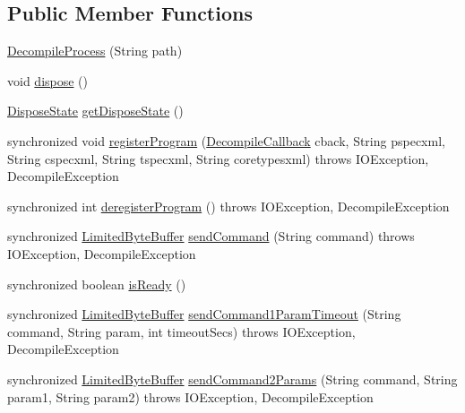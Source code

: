 \subsection*{Public Member Functions}
\begin{DoxyCompactItemize}
\item 
\mbox{\hyperlink{classghidra_1_1app_1_1decompiler_1_1_decompile_process_a1d87e3793a82ac3421528f78ce195b17}{Decompile\+Process}} (String path)
\item 
void \mbox{\hyperlink{classghidra_1_1app_1_1decompiler_1_1_decompile_process_aa2643106f26e9f4e6e603431903f29e4}{dispose}} ()
\item 
\mbox{\hyperlink{enumghidra_1_1app_1_1decompiler_1_1_decompile_process_1_1_dispose_state}{Dispose\+State}} \mbox{\hyperlink{classghidra_1_1app_1_1decompiler_1_1_decompile_process_ac9ea5dc37b98e60a02ebc537bde184bb}{get\+Dispose\+State}} ()
\item 
synchronized void \mbox{\hyperlink{classghidra_1_1app_1_1decompiler_1_1_decompile_process_a40583f5d5b24e837f7837ccab1510330}{register\+Program}} (\mbox{\hyperlink{classghidra_1_1app_1_1decompiler_1_1_decompile_callback}{Decompile\+Callback}} cback, String pspecxml, String cspecxml, String tspecxml, String coretypesxml)  throws I\+O\+Exception, 			\+Decompile\+Exception 
\item 
synchronized int \mbox{\hyperlink{classghidra_1_1app_1_1decompiler_1_1_decompile_process_a0f33c60970b4db8f9f42d31623cd91c9}{deregister\+Program}} ()  throws I\+O\+Exception, Decompile\+Exception 
\item 
synchronized \mbox{\hyperlink{classghidra_1_1app_1_1decompiler_1_1_limited_byte_buffer}{Limited\+Byte\+Buffer}} \mbox{\hyperlink{classghidra_1_1app_1_1decompiler_1_1_decompile_process_a36fc409f22c26d36509fc3c06a8b9f93}{send\+Command}} (String command)  throws I\+O\+Exception, Decompile\+Exception 
\item 
synchronized boolean \mbox{\hyperlink{classghidra_1_1app_1_1decompiler_1_1_decompile_process_a7ceab405dca0a6c7e79998fd632c2c0b}{is\+Ready}} ()
\item 
synchronized \mbox{\hyperlink{classghidra_1_1app_1_1decompiler_1_1_limited_byte_buffer}{Limited\+Byte\+Buffer}} \mbox{\hyperlink{classghidra_1_1app_1_1decompiler_1_1_decompile_process_a4091afccee2689876c3426cb8c6b663c}{send\+Command1\+Param\+Timeout}} (String command, String param, int timeout\+Secs)  throws I\+O\+Exception, Decompile\+Exception 
\item 
synchronized \mbox{\hyperlink{classghidra_1_1app_1_1decompiler_1_1_limited_byte_buffer}{Limited\+Byte\+Buffer}} \mbox{\hyperlink{classghidra_1_1app_1_1decompiler_1_1_decompile_process_a750351ec80276adefd3c56dcf5ab2dfe}{send\+Command2\+Params}} (String command, String param1, String param2)  throws I\+O\+Exception, Decompile\+Exception 

\end{DoxyCompactItemize}
